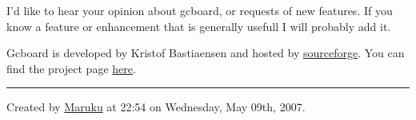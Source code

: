 \documentclass{article}
\begin{document}
I'{}d like to hear your opinion about gcboard, or requests of new features. If you know a feature or enhancement that is generally usefull I will probably add it.

Gcboard is developed by Kristof Bastiaensen and hosted by \href{"http://sourceforge.net"}{sourceforge}. You can find the project page \href{"http://sourceforge.net/projects/gcboard"}{here}.

\vfill
\hrule
\vspace{1.2mm}
\begin{tiny}
Created by \href{http://maruku.rubyforge.org}{Maruku}  at 22:54 on Wednesday, May 09th, 2007.
\end{tiny}
\end{document}
